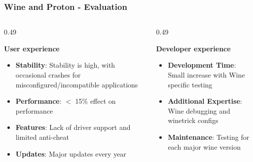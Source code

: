 \begin{frame}
\frametitle{Wine and Proton - Evaluation}

\vspace{-30pt}
\begin{columns}[T,onlytextwidth]
    \begin{column}{0.49\textwidth}
        \begin{theorembox}
        \textbf{User experience}
        \vspace{5pt}
        \begin{itemize}
            \setlength{\itemsep}{4pt}
            \item \textbf{Stability}: Stability is high, with occasional crashes for misconfigured/incompatible applications
            \item \textbf{Performance}: $<$ 15\% effect on performance \cite{Comp_intelligence}
            \item \textbf{Features}: Lack of driver support and limited anti-cheat \cite{driver-research}
            \item \textbf{Updates}: Major updates every year \cite{wine_gitlab}
        \end{itemize}
        \end{theorembox}
    \end{column}

    \begin{column}{0.49\textwidth}
        \begin{theorembox}
        \textbf{Developer experience}
        \vspace{5pt}
        \begin{itemize}
            \setlength{\itemsep}{4pt}
            \item \textbf{Development Time}: Small increase with Wine specific testing
            \item \textbf{Additional Expertise}: Wine debugging and winetrick configs
            \item \textbf{Maintenance}: Testing for each major wine version
        \end{itemize}
        \vspace{42pt}
        \end{theorembox}
    \end{column}
\end{columns}

\end{frame}